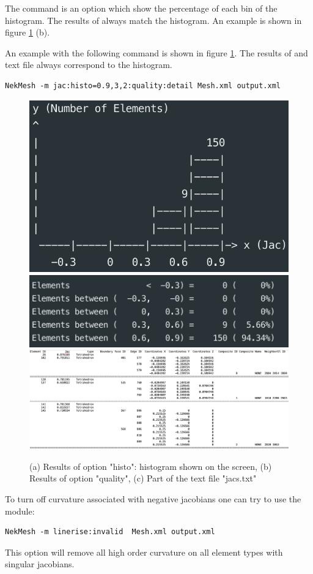 The command  is an option which show the percentage of each bin of the histogram. The results of  always match the histogram. An example is shown in figure \ref{fig:util:mesh:histo} (b). 

An example with the following command is shown in figure \ref {fig:util:mesh:histo}. The results of  and text file always correspond to the histogram.

\begin{lstlisting}[style=BashInputStyle]
NekMesh -m jac:histo=0.9,3,2:quality:detail Mesh.xml output.xml
\end{lstlisting}

\begin{figure}[!htbp]
  \begin{center}
    \includegraphics[width = 0.47 \textwidth]{img/ProcessJac_histo.png}
    \includegraphics[width = 0.47 \textwidth]{img/ProcessJac_quality.png}
    \includegraphics[width = 1.0 \textwidth]{img/ProcessJac_output.png}
    \caption{(a) Results of option "histo": histogram shown on the screen, (b) Results of option "quality", (c) Part of the text file "jacs.txt"}
    \label{fig:util:mesh:histo}
  \end{center}
\end{figure}

To turn off curvature associated with negative jacobians one can try to use the
 module:
\begin{lstlisting}[style=BashInputStyle]
NekMesh -m linerise:invalid  Mesh.xml output.xml
\end{lstlisting}
This option will remove all high order curvature on all element types
with singular jacobians.

